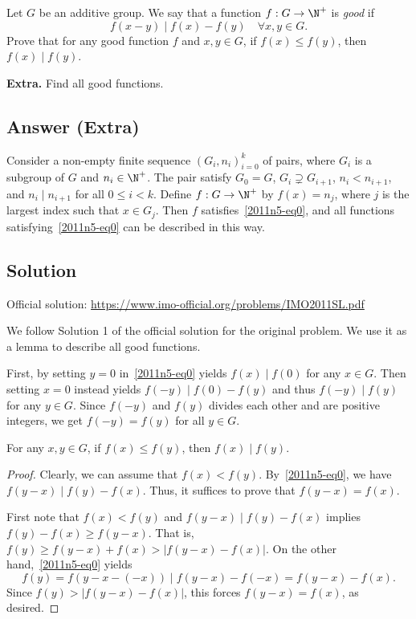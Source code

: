 Let $G$ be an additive group.
We say that a function $f : G \to \N^+$ is \emph{good} if
\[ f(x - y) \mid f(x) - f(y) \quad \forall x, y \in G. \tag{*}\label{2011n5-eq0} \]
Prove that for any good function $f$ and $x, y \in G$, if $f(x) \leq f(y)$, then $f(x) \mid f(y)$.

\textbf{Extra.}
Find all good functions.



\subsection*{Answer (Extra)}

Consider a non-empty finite sequence $(G_i, n_i)_{i = 0}^k$ of pairs, where $G_i$ is a subgroup of $G$ and $n_i \in \N^+$.
The pair satisfy $G_0 = G$, $G_i \supsetneq G_{i + 1}$, $n_i < n_{i + 1}$, and $n_i \mid n_{i + 1}$ for all $0 \leq i < k$.
Define $f : G \to \N^+$ by $f(x) = n_j$, where $j$ is the largest index such that $x \in G_j$.
Then $f$ satisfies~\eqref{2011n5-eq0}, and all functions satisfying~\eqref{2011n5-eq0} can be described in this way.



\subsection*{Solution}

Official solution: \url{https://www.imo-official.org/problems/IMO2011SL.pdf}

We follow Solution 1 of the official solution for the original problem.
We use it as a lemma to describe all good functions.

First, by setting $y = 0$ in~\eqref{2011n5-eq0} yields $f(x) \mid f(0)$ for any $x \in G$.
Then setting $x = 0$ instead yields $f(-y) \mid f(0) - f(y)$ and thus $f(-y) \mid f(y)$ for any $y \in G$.
Since $f(-y)$ and $f(y)$ divides each other and are positive integers, we get $f(-y) = f(y)$ for all $y \in G$.

\begin{lemma}
For any $x, y \in G$, if $f(x) \leq f(y)$, then $f(x) \mid f(y)$.
\end{lemma}
\begin{proof}
Clearly, we can assume that $f(x) < f(y)$.
By~\eqref{2011n5-eq0}, we have $f(y - x) \mid f(y) - f(x)$.
Thus, it suffices to prove that $f(y - x) = f(x)$.

First note that $f(x) < f(y)$ and $f(y - x) \mid f(y) - f(x)$ implies $f(y) - f(x) \geq f(y - x)$.
That is, $f(y) \geq f(y - x) + f(x) > |f(y - x) - f(x)|$.
On the other hand,~\eqref{2011n5-eq0} yields
\[ f(y) = f(y - x - (-x)) \mid f(y - x) - f(-x) = f(y - x) - f(x). \]
Since $f(y) > |f(y - x) - f(x)|$, this forces $f(y - x) = f(x)$, as desired.
\end{proof}

